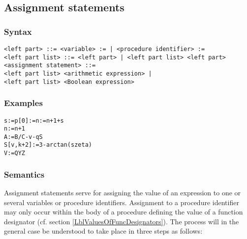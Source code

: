 \documentclass[a4paper,11pt]{article}
\begin{document}
\subsection{Assignment statements}


\subsubsection{Syntax}
\label{LblAssignmentStatementSyntax}

\begin{flushleft}
\vspace{0.2em}\texttt{<left part> ::= <variable> := | <procedure identifier> :=}\\

\vspace{0.2em}\texttt{<left part list> ::= <left part> | <left part list> <left part>}\\

\vspace{0.2em}\texttt{<assignment statement> ::=\\
  \hspace{1.0cm}<left part list> <arithmetic expression> |\\
  \hspace{1.0cm}<left part list> <Boolean expression>}\\
\end{flushleft}


\subsubsection{Examples}

\begin{flushleft}
\texttt{s:=p[0]:=n:=n+1+s\\
n:=n+1\\
A:=B/C-v-q\mtim{}S\\
S[v,k+2]:=3-arctan(s\mtim{}zeta)\\
V:=Q\mgt{}Y\mland{}Z}\\
\end{flushleft}


\subsubsection{Semantics}
\label{LblAssignmentStatementSemantics}

Assignment statements serve for assigning the value of an expression
to one or several variables or procedure identifiers.  Assignment to a
procedure identifier may only occur within the body of a procedure
defining the value of a function designator (cf. section
\ref{LblValuesOfFuncDesignators}).  The process will in the general
case be understood to take place in three steps as follows:
\end{document}

